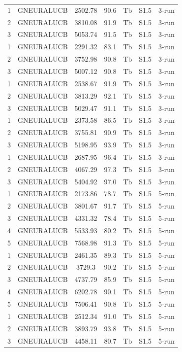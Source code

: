\documentclass[11pt]{article}
\begin{document}
\begin{center}
\begin{longtable}{|c|c|c|c|c|c|c|}
1 & GNEURALUCB & 2502.78 & 90.6 & Tb & S1.5 & 3-run \\
2 & GNEURALUCB & 3810.08 & 91.9 & Tb & S1.5 & 3-run \\
3 & GNEURALUCB & 5053.74 & 91.5 & Tb & S1.5 & 3-run \\
1 & GNEURALUCB & 2291.32 & 83.1 & Tb & S1.5 & 3-run \\
2 & GNEURALUCB & 3752.98 & 90.8 & Tb & S1.5 & 3-run \\
3 & GNEURALUCB & 5007.12 & 90.8 & Tb & S1.5 & 3-run \\
1 & GNEURALUCB & 2538.67 & 91.9 & Tb & S1.5 & 3-run \\
2 & GNEURALUCB & 3813.29 & 92.1 & Tb & S1.5 & 3-run \\
3 & GNEURALUCB & 5029.47 & 91.1 & Tb & S1.5 & 3-run \\
1 & GNEURALUCB & 2373.58 & 86.5 & Tb & S1.5 & 3-run \\
2 & GNEURALUCB & 3755.81 & 90.9 & Tb & S1.5 & 3-run \\
3 & GNEURALUCB & 5198.95 & 93.9 & Tb & S1.5 & 3-run \\
1 & GNEURALUCB & 2687.95 & 96.4 & Tb & S1.5 & 3-run \\
2 & GNEURALUCB & 4067.29 & 97.3 & Tb & S1.5 & 3-run \\
3 & GNEURALUCB & 5404.92 & 97.0 & Tb & S1.5 & 3-run \\
1 & GNEURALUCB & 2173.86 & 78.7 & Tb & S1.5 & 5-run \\
2 & GNEURALUCB & 3801.67 & 91.7 & Tb & S1.5 & 5-run \\
3 & GNEURALUCB & 4331.32 & 78.4 & Tb & S1.5 & 5-run \\
4 & GNEURALUCB & 5533.93 & 80.2 & Tb & S1.5 & 5-run \\
5 & GNEURALUCB & 7568.98 & 91.3 & Tb & S1.5 & 5-run \\
1 & GNEURALUCB & 2461.35 & 89.3 & Tb & S1.5 & 5-run \\
2 & GNEURALUCB & 3729.3 & 90.2 & Tb & S1.5 & 5-run \\
3 & GNEURALUCB & 4737.79 & 85.9 & Tb & S1.5 & 5-run \\
4 & GNEURALUCB & 6202.78 & 90.1 & Tb & S1.5 & 5-run \\
5 & GNEURALUCB & 7506.41 & 90.8 & Tb & S1.5 & 5-run \\
1 & GNEURALUCB & 2512.34 & 91.0 & Tb & S1.5 & 5-run \\
2 & GNEURALUCB & 3893.79 & 93.8 & Tb & S1.5 & 5-run \\
3 & GNEURALUCB & 4458.11 & 80.7 & Tb & S1.5 & 5-run \\

\end{longtable}
\end{center}
\end{document}
